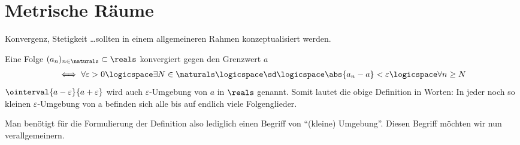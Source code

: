 \chapter{Metrische Räume}
\begin{ziel*}
    Konvergenz, Stetigkeit \ldots sollten in einem allgemeineren Rahmen konzeptualisiert werden.
\end{ziel*}
\begin{erinnerung*}[\diffcourse{1}]
    Eine Folge \( (a_n)_{n\in \naturals}\subset \reals \) konvergiert gegen den Grenzwert \( a \)
    \begin{align*}
        \iff \forall \varepsilon>0 \logicspace\exists N\in \naturals\logicspace\text{\sd}\logicspace \abs{a_n-a}<\varepsilon\logicspace\forall n \geq N
    \end{align*}
    \( \ointerval{a-\varepsilon}{a+\varepsilon} \) wird auch \( \varepsilon \)-Umgebung von \( a \) in \( \reals \) genannt. 
    Somit lautet die obige Definition in Worten: 
    In jeder noch so kleinen \( \varepsilon \)-Umgebung von a befinden sich alle bis auf endlich viele Folgenglieder.    
\end{erinnerung*}
Man benötigt für die Formulierung der Definition also lediglich einen Begriff von \enquote{(kleine) Umgebung}. 
Diesen Begriff möchten wir nun verallgemeinern.
    
